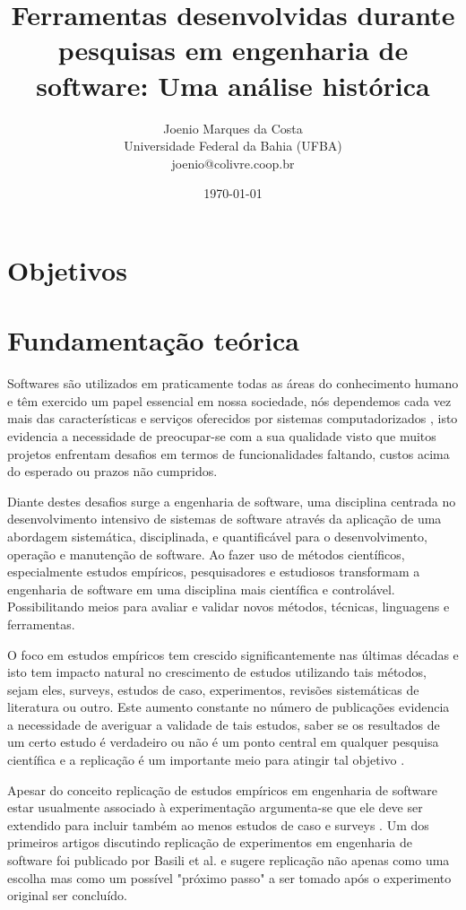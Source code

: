 \documentclass[12pt]{article}
\title{
  Ferramentas desenvolvidas durante pesquisas em engenharia de software:
  Uma análise histórica
}
\author{Joenio Marques da Costa\\
  {\small Universidade Federal da Bahia (UFBA)} \\
  {\small joenio@colivre.coop.br}
}
\date{\today}
\begin{document}
\maketitle

\section{Objetivos}

\section{Fundamentação teórica}

Softwares são utilizados em praticamente todas as áreas do conhecimento humano
e têm exercido um papel essencial em nossa sociedade, nós dependemos cada vez
mais das características e serviços oferecidos por sistemas computadorizados
\cite{Mafra2006}, isto evidencia a necessidade de preocupar-se com a sua
qualidade visto que muitos projetos enfrentam desafios em
termos de funcionalidades faltando, custos acima do esperado ou prazos não
cumpridos.

Diante destes desafios surge a engenharia de software, uma disciplina centrada
no desenvolvimento intensivo de sistemas de software \cite{Wohlin2012} através
da aplicação de uma abordagem sistemática, disciplinada, e quantificável para
o desenvolvimento, operação e manutenção \cite{SWEBOK2014} de software. Ao
fazer uso de métodos científicos, especialmente estudos empíricos,
pesquisadores e estudiosos transformam a engenharia de software em uma
disciplina mais científica e controlável. Possibilitando meios para
avaliar e validar novos métodos, técnicas, linguagens e ferramentas.

O foco em estudos empíricos tem crescido significantemente nas últimas décadas
\cite{Stol2015} e isto tem impacto natural no crescimento de estudos
utilizando tais métodos, sejam eles, surveys, estudos de caso, experimentos,
revisões sistemáticas de literatura ou outro. Este aumento constante no número
de publicações evidencia a necessidade de averiguar a validade de tais
estudos, saber se os resultados de um certo estudo é verdadeiro ou não é um
ponto central em qualquer pesquisa científica e a replicação é um importante
meio para atingir tal objetivo \cite{Almqvist2006}.

Apesar do conceito replicação de estudos empíricos em engenharia de software
estar usualmente associado à experimentação argumenta-se que ele deve ser
extendido para incluir também ao menos estudos de caso e surveys
\cite{Mantyla2010}. Um dos primeiros artigos discutindo replicação de
experimentos em engenharia de software foi publicado por Basili et al.
\cite{Basili1986} e sugere replicação não apenas como uma escolha mas como um
possível "próximo passo" a ser tomado após o experimento original ser
concluído.
\end{document}
